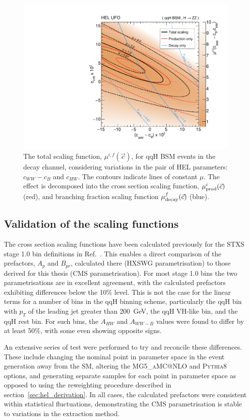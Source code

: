 \begin{figure}[htb!]
  \centering
  \includegraphics[width=.7\textwidth]{Figures/eft/scaling_functions/qqH_BSM_hzz_cWWMinuscB_vs_cHW.pdf}
  \caption[Two dimensional HEL total scaling function example]
  {
    The total scaling function, $\mu^{i,f}(\vec{c})$, for qqH BSM events in the \Hfl decay channel, considering variations in the pair of HEL parameters: $c_{WW}-c_B$ and $c_{HW}$. The contours indicate lines of constant $\mu$. The effect is decomposed into the cross section scaling function, $\mu_{\rm{prod}}^i(\vec{c})$ (red), and branching fraction scaling function $\mu_{\rm{decay}}^f(\vec{c})$ (blue).
  }
  \label{fig:hel_total_example}
\end{figure}

\subsection{Validation of the scaling functions}\label{sec:hel_validation}
The cross section scaling functions have been calculated previously for the STXS stage 1.0 bin definitions in Ref.~\cite{Hays:2673969}. This enables a direct comparison of the prefactors, $A_p$ and $B_{pr}$, calculated there (HXSWG parametrisation) to those derived for this thesis (CMS parametrisation). For most stage 1.0 bins the two parametrisations are in excellent agreement, with the calculated prefactors exhibiting differences below the 10\% level. This is not the case for the linear terms for a number of bins in the qqH binning scheme, particularly the qqH bin with $p_T$ of the leading jet greater than 200~GeV, the qqH VH-like bin, and the qqH rest bin. For such bins, the $A_{HW}$ and $A_{WW-B}$ values were found to differ by at least 50\%, with some even showing opposite signs.

An extensive series of test were performed to try and reconcile these differences. These include changing the nominal point in parameter space in the event generation away from the SM, altering the \textsc{MG5\_aMC@NLO} and \textsc{Pythia8} options, and generating separate samples for each point in parameter space as opposed to using the reweighting procedure described in section~\ref{sec:hel_derivation}. In all cases, the calculated prefactors were consistent within statistical fluctuations, demonstrating the CMS parametrisation is stable to variations in the extraction method. 

